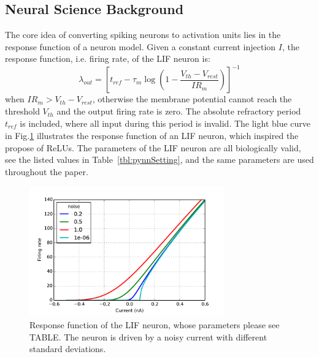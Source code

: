 \documentclass[runningheads,a4paper]{llncs}
\begin{document}
\subsection{Neural Science Background}
The core idea of converting spiking neurons to activation units lies in the response function of a neuron model.
Given a constant current injection $I$, the response function, i.e. firing rate, of the LIF neuron is:
\begin{equation}
\lambda_\mathit{out}=
\left [ t_\mathit{ref}-\tau_m\log \left ( 1-\frac{V_{th}-V_\mathit{rest}}{IR_m}  \right )\right ]^{-1}
\label{equ:consI}
\end{equation}
when $IR_m>V_{th}-V_{rest}$, otherwise the membrane potential cannot reach the threshold $V_{th}$ and the output firing rate is zero. 
The absolute refractory period $t_\mathit{ref}$ is included, where all input during this period is invalid.
The light blue curve in Fig.\ref{fig:physics} illustrates the response function of an LIF neuron, which inspired the propose of ReLUs.
The parameters of the LIF neuron are all biologically valid, see the listed values in Table~\ref{tbl:pynnSetting}, and the same parameters are used throughout the paper.
\begin{figure}[bt!]
	\centering
	\includegraphics[width=0.75\textwidth]{pic/1.pdf}
	\caption{
	Response function of the LIF neuron, whose parameters please see TABLE.
	The neuron is driven by a noisy current with different standard deviations. }
	\label{fig:physics}	
\end{figure}
\end{document}
